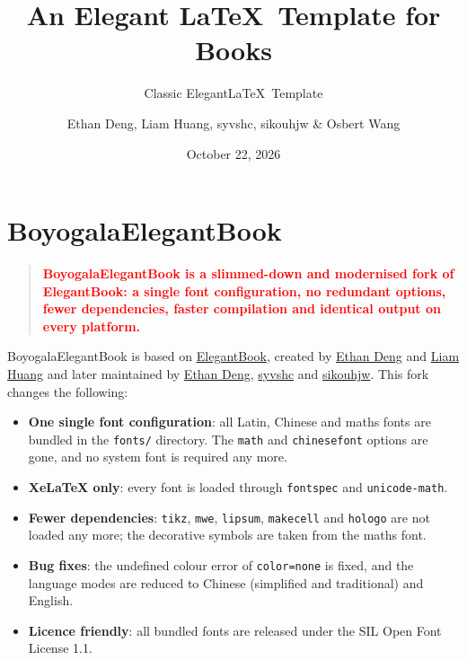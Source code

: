 \documentclass[11pt]{boyogalaelegantbook}
\title{An Elegant \LaTeX\ Template for Books}  %
\subtitle{Classic Elegant\LaTeX\ Template}     %
\author{Ethan Deng, Liam Huang, syvshc, sikouhjw \& Osbert Wang}  %
\institute{Elegant\LaTeX\ Program}             %
\date{October 22, 2026}                             %
\begin{document}
\maketitle

\frontmatter

\tableofcontents

\mainmatter

\chapter{BoyogalaElegantBook}
\begin{quotation}
  \textbf{\textcolor{red}{BoyogalaElegantBook is a slimmed-down and modernised fork of ElegantBook: a single font configuration, no redundant options, fewer dependencies, faster compilation and identical output on every platform.}}
\end{quotation}

BoyogalaElegantBook is based on \href{https://github.com/ElegantLaTeX/ElegantBook}{ElegantBook}, created by \href{https://github.com/EthanDeng}{Ethan Deng} and \href{https://github.com/Liam0205}{Liam Huang} and later maintained by \href{https://github.com/EthanDeng}{Ethan Deng}, \href{https://github.com/syvshc}{syvshc} and \href{https://github.com/sikouhjw}{sikouhjw}.  This fork changes the following:

\begin{itemize}
  \item \textbf{One single font configuration}: all Latin, Chinese and maths fonts are bundled in the \lstinline{fonts/} directory.  The \lstinline{math} and \lstinline{chinesefont} options are gone, and no system font is required any more.
  \item \textbf{XeLaTeX only}: every font is loaded through \lstinline{fontspec} and \lstinline{unicode-math}.
  \item \textbf{Fewer dependencies}: \lstinline{tikz}, \lstinline{mwe}, \lstinline{lipsum}, \lstinline{makecell} and \lstinline{hologo} are not loaded any more; the decorative symbols are taken from the maths font.
  \item \textbf{Bug fixes}: the undefined colour error of \lstinline{color=none} is fixed, and the language modes are reduced to Chinese (simplified and traditional) and English.
  \item \textbf{Licence friendly}: all bundled fonts are released under the SIL Open Font License 1.1.
\end{itemize}
\end{document}

